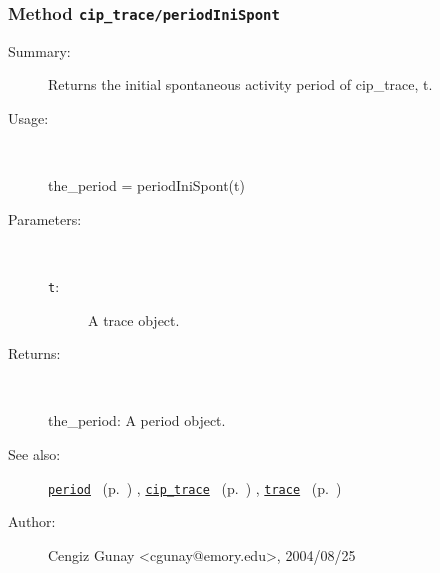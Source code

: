 \subsubsection[Method \texttt{periodIniSpont}]{Method \texttt{cip\_trace/periodIniSpont}}%
%
\label{ref_cip_trace__periodIniSpont}%
\hypertarget{ref_cip_trace__periodIniSpont}{}%
\begin{description}
\item[Summary:]Returns the initial spontaneous activity period of 
		cip\_trace, t. 
%
\item[Usage:]~%
\begin{lyxcode}%
the\_period = periodIniSpont(t)
%
\end{lyxcode}%
%
%
\item[Parameters:]~
\begin{description}%
\item[\texttt{t}:]
 A trace object.
\end{description}%
%
\item[Returns:
]~

	the\_period: A period object.
%
%
\item[See also:]%
\hyperlink{ref_period}{\texttt{period}}%
\ (p.~\pageref{ref_period})%
%
, \hyperlink{ref_cip_trace}{\texttt{cip\_trace}}%
\ (p.~\pageref{ref_cip_trace})%
%
, \hyperlink{ref_trace}{\texttt{trace}}%
\ (p.~\pageref{ref_trace})%
%
%
\item[Author:]%
Cengiz Gunay <cgunay@emory.edu>, 2004/08/25
%
\end{description}
\methodline%
